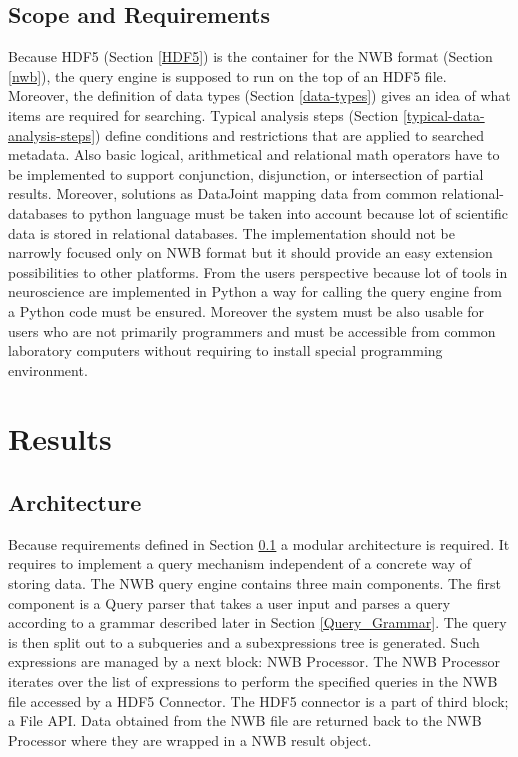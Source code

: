 \documentclass[utf8]{frontiersSCNS} %
\begin{document}
\subsection{Scope and Requirements}
\label{Scope_and_requirements}

Because HDF5 (Section \ref{HDF5}) is the container for the NWB format (Section \ref{nwb}), the query engine is supposed to run on the top of an HDF5 file. Moreover, the definition of data types (Section \ref{data-types}) gives an idea of what items are required for searching. Typical analysis steps (Section \ref{typical-data-analysis-steps}) define conditions and restrictions that are applied to searched metadata. Also basic logical, arithmetical and relational math operators have to be implemented to support conjunction, disjunction, or intersection of partial results. Moreover, solutions as DataJoint mapping data from common relational-databases to python language must be taken into account because lot of scientific data is stored in relational databases. The implementation should not be narrowly focused only on NWB format but it should provide an easy extension possibilities to other platforms. From the users perspective because lot of tools in neuroscience are implemented in Python a way for calling the query engine from a Python code must be ensured. Moreover the system must be also usable for users who are not primarily programmers and must be accessible from common laboratory computers without requiring to install special programming environment.

\section{Results}
\label{results}


\subsection{Architecture}
\label{Architecture}

Because requirements defined in Section \ref{Scope_and_requirements} a modular architecture is required. It requires to implement a query mechanism independent of a concrete way of storing data. The NWB query engine contains three main components. The first component is a Query parser that takes a user input and parses a query according to a grammar described later in Section \ref{Query_Grammar}. The query is then split out to a subqueries and a subexpressions tree is generated. Such expressions are managed by a next block: NWB Processor. The NWB Processor iterates over the list of expressions to perform the specified queries  in the NWB file accessed by a HDF5 Connector. The HDF5 connector is a part of third block; a File API. Data obtained from the NWB file are returned back to the NWB Processor where they are wrapped in a NWB result object.
\end{document}
